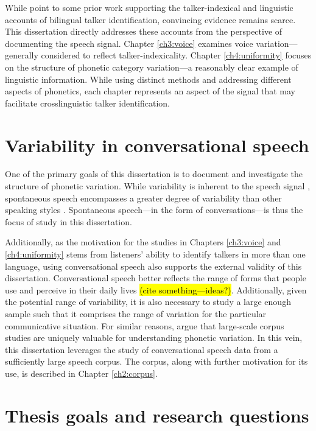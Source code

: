 While \citet{orena_2019_identifying} point to some prior work supporting the talker-indexical and linguistic accounts of bilingual talker identification, convincing evidence remains scarce. This dissertation directly addresses these accounts from the perspective of documenting the speech signal. Chapter \ref{ch3:voice} examines voice variation---generally considered to reflect talker-indexicality. Chapter \ref{ch4:uniformity} focuses on the structure of phonetic category variation---a reasonably clear example of linguistic information. While using distinct methods and addressing different aspects of phonetics, each chapter represents an aspect of the signal that may facilitate crosslinguistic talker identification. 

\section{Variability in conversational speech}\label{ch1:sec:spontaneous}

One of the primary goals of this dissertation is to document and investigate the structure of phonetic variation. While variability is inherent to the speech signal \citep[cf. the lack of invariance problem][]{liberman_1967_perception}, spontaneous speech encompasses a greater degree of variability than other speaking styles \citep[e.g., reduction phenomena:][]{johnson_2004_massive}. Spontaneous speech---in the form of conversations---is thus the focus of study in this dissertation. 

Additionally, as the motivation for the studies in Chapters \ref{ch3:voice} and \ref{ch4:uniformity} stems from listeners' ability to identify talkers in more than one language, using conversational speech also supports the external validity of this dissertation. Conversational speech better reflects the range of forms that people use and perceive in their daily lives \hl{(cite something---ideas?)}. Additionally, given the potential range of variability, it is also necessary to study a large enough sample such that it comprises the range of variation for the particular communicative situation. For similar reasons, \citet{tanner_2020_english} argue that large-scale corpus studies are uniquely valuable for understanding phonetic variation. In this vein, this dissertation leverages the study of conversational speech data from a sufficiently large speech corpus. The corpus, along with further motivation for its use, is described in Chapter \ref{ch2:corpus}.

\section{Thesis goals and research questions}\label{ch1:sec:goals}

